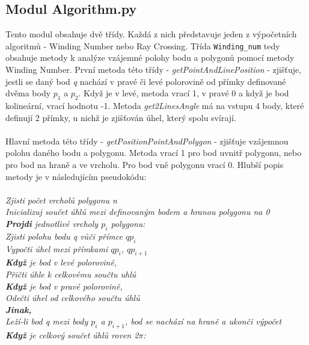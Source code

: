 \documentclass{article}
\begin{document}
\subsection{\small{Modul Algorithm.py}}
Tento modul obsahuje dvě třídy. Každá z nich představuje jeden z výpočetních algoritmů - Winding Number nebo Ray Crossing. Třída \texttt{Winding\_num} tedy obsahuje metody k analýze vzájemné polohy bodu a polygonů pomocí metody Winding Number. První metoda této třídy - \emph{getPointAndLinePosition} - zjišťuje, jestli se daný bod \emph{q} nachází v pravé či levé polorovině od přímky definované dvěma body $p_{1}$ a $p_{2}$. Když je v levé, metoda vrací 1, v pravé 0 a když je bod kolineární, vrací hodnotu -1. Metoda \emph{get2LinesAngle} má na vstupu 4 body, které definují 2 přímky, u nichž je zjišťován úhel, který spolu svírají.\\
\vspace{0.2cm}\\
Hlavní metoda této třídy - \emph{getPositionPointAndPolygon} - zjišťuje vzájemnou polohu daného bodu a polygonu. Metoda vrací 1 pro bod uvnitř polygonu, nebo pro bod na hraně a ve vrcholu. Pro bod vně polygonu vrací 0. Hlubší popis metody je v následujícím pseudokódu:\\
\vspace{0.2cm}\\
\indent\textit{Zjisti počet vrcholů polygonu n}\\
\indent\textit{Inicializuj součet úhlů mezi definovaným bodem a hranou polygonu na 0}\\
\indent\textit{\textbf{Projdi} jednotlivé vrcholy $p_{i}$ polygonu:}\\
\indent\indent\textit{Zjisti polohu bodu q vůči přímce $qp_{i}$}\\
\indent\indent\textit{Vypočti úhel mezi přímkami $qp_{i}$, $qp_{i+1}$}\\
\indent\indent\textit{\textbf{Když} je bod v levé polorovině,}\\
\indent\indent\indent\textit{Přičti úhle k celkovému součtu uhlů}\\
\indent\indent\textit{\textbf{Když} je bod v pravé polorovině,}\\
\indent\indent\indent\textit{Odečti úhel od celkového součtu úhlů}\\
\indent\indent\textit{\textbf{Jinak,}}\\
\indent\indent\indent\textit{Leží-li bod q mezi body $p_{i}$ a $p_{i+1}$, bod se nachází na hraně a ukonči výpočet}\\
\indent\textit{\textbf{Když} je celkový součet úhlů roven 2$\pi$:}\\
\end{document}
